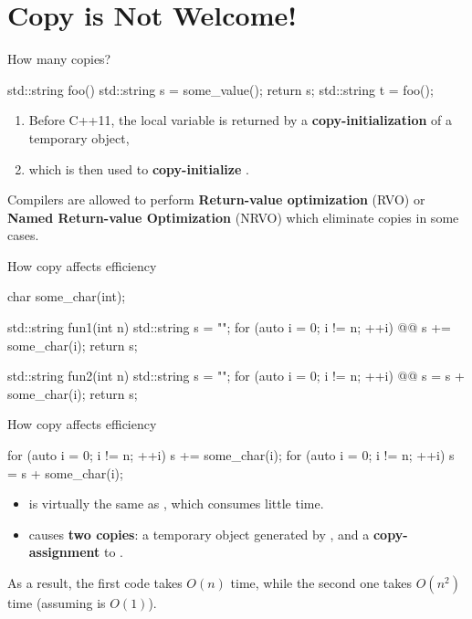 
\section{Copy is Not Welcome!}

\begin{frame}[fragile]{How many copies?}
  \begin{cpp}
std::string foo() {
  std::string s = some_value();
  return s;
}
std::string t = foo();
  \end{cpp}
  \pause
  \begin{enumerate}
    \item Before C++11, the local variable  is returned by a \textbf{copy-initialization} of a temporary object,
    \item which is then used to \textbf{copy-initialize} .
    \pause
  \end{enumerate}
  Compilers are allowed to perform \textbf{Return-value optimization} (RVO) or \textbf{Named Return-value Optimization} (NRVO) which eliminate copies in some cases.
\end{frame}

\begin{frame}[fragile]{How copy affects efficiency}
  \begin{cpp}
char some_char(int);

std::string fun1(int n) {
  std::string s = "";
  for (auto i = 0; i != n; ++i)
@\pinkbox @    s += some_char(i);
  return s;
}

std::string fun2(int n) {
  std::string s = "";
  for (auto i = 0; i != n; ++i)
@\pinkbox @    s = s + some_char(i);
  return s;
}
  \end{cpp}
\end{frame}

\begin{frame}[fragile]{How copy affects efficiency}
  \begin{cpp}
for (auto i = 0; i != n; ++i)
  s += some_char(i);
for (auto i = 0; i != n; ++i)
  s = s + some_char(i);
  \end{cpp}
  \begin{itemize}
    \item {} is virtually the same as , which consumes little time.
    \item {} causes \textbf{two copies}: a temporary object generated by , and a \textbf{copy-assignment} to .
  \end{itemize}
  \pause
  As a result, the first code takes \(O(n)\) time, while the second one takes \(O\left(n^2\right)\) time (assuming  is \(O(1)\)).
\end{frame}

